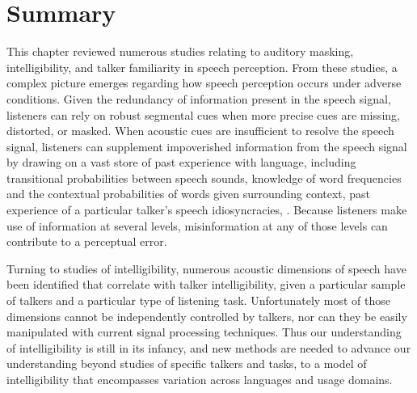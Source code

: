 \section[Summary]{Summary\label{sec:BkgdSummary}}
This chapter reviewed numerous studies relating to auditory masking, intelligibility, and talker familiarity in speech perception.  From these studies, a complex picture emerges regarding how speech perception occurs under adverse conditions.  Given the redundancy of information present in the speech signal, listeners can rely on robust segmental cues when more precise cues are missing, distorted, or masked.  When acoustic cues are insufficient to resolve the speech signal, listeners can supplement impoverished information from the speech signal by drawing on a vast store of past experience with language, including transitional probabilities between speech sounds, knowledge of word frequencies and the contextual probabilities of words given surrounding context, past experience of a particular talker’s speech idiosyncracies, \etc.  Because listeners make use of information at several levels, misinformation at any of those levels can contribute to a perceptual error. 

Turning to studies of intelligibility, numerous acoustic dimensions of speech have been identified that correlate with talker intelligibility, given a particular sample of talkers and a particular type of listening task.  Unfortunately most of those dimensions cannot be independently controlled by talkers, nor can they be easily manipulated with current signal processing techniques.  Thus our understanding of intelligibility is still in its infancy, and new methods are needed to advance our understanding beyond studies of specific talkers and tasks, to a model of intelligibility that encompasses variation across languages and usage domains.


